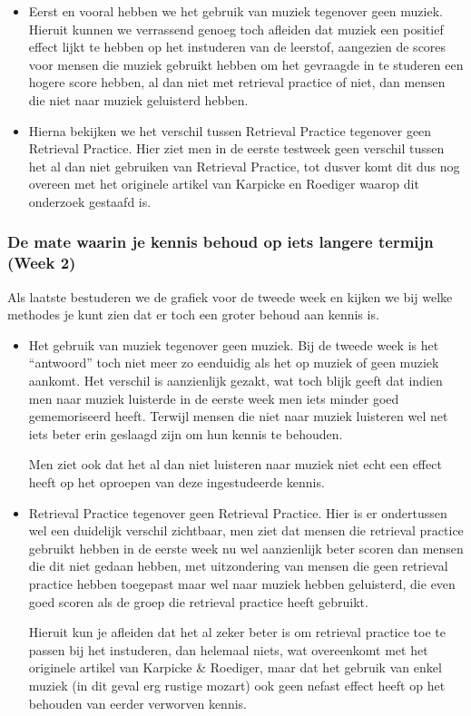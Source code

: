 \documentclass{hogent-article}
\begin{document}
\begin{itemize}
    \item Eerst en vooral hebben we het gebruik van muziek tegenover geen muziek.
    Hieruit kunnen we verrassend genoeg toch afleiden dat muziek een positief effect lijkt te hebben op het instuderen van de leerstof, aangezien de scores voor mensen die muziek gebruikt hebben om het gevraagde in te studeren een hogere score hebben, al dan niet met retrieval practice of niet, dan mensen die niet naar muziek geluisterd hebben.
    \item Hierna bekijken we het verschil tussen Retrieval Practice tegenover geen Retrieval Practice.
    Hier ziet men in de eerste testweek geen verschil tussen het al dan niet gebruiken van Retrieval Practice, tot dusver komt dit dus nog overeen met het originele artikel van Karpicke en Roediger waarop dit onderzoek gestaafd is.
    
\end{itemize}

\subsubsection{De mate waarin je kennis behoud op iets langere termijn (Week 2)}

Als laatste bestuderen we de grafiek voor de tweede week en kijken we bij welke methodes je kunt zien dat er toch een groter behoud aan kennis is.


\begin{itemize}
    \item Het gebruik van muziek tegenover geen muziek. Bij de tweede week is het “antwoord” toch niet meer zo eenduidig als het op muziek of geen muziek aankomt. Het verschil is aanzienlijk gezakt, wat toch blijk geeft dat indien men naar muziek luisterde in de eerste week men iets minder goed gememoriseerd heeft. Terwijl mensen die niet naar muziek luisteren wel net iets beter erin geslaagd zijn om hun kennis te behouden.
    
    Men ziet ook dat het al dan niet luisteren naar muziek niet echt een effect heeft op het oproepen van deze ingestudeerde kennis.
    
    \item Retrieval Practice tegenover geen Retrieval Practice. Hier is er ondertussen wel een duidelijk verschil zichtbaar, men ziet dat mensen die retrieval practice gebruikt hebben in de eerste week nu wel aanzienlijk beter scoren dan mensen die dit niet gedaan hebben, met uitzondering van mensen die geen retrieval practice hebben toegepast maar wel naar muziek hebben geluisterd, die even goed scoren als de groep die retrieval practice heeft gebruikt. 
    
    Hieruit kun je afleiden dat het al zeker beter is om retrieval practice toe te passen bij het instuderen, dan helemaal niets, wat overeenkomt met het originele artikel van Karpicke \& Roediger, maar dat het gebruik van enkel muziek (in dit geval erg rustige mozart) ook geen nefast effect heeft op het behouden van eerder verworven kennis.
    
\end{itemize}
    
\end{document}
